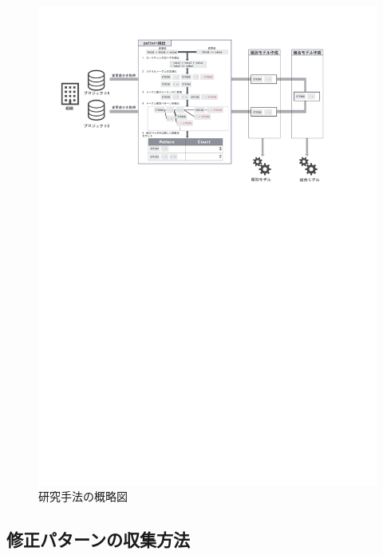 \documentclass[T,J]{fose} %
\begin{document}
\begin{figure}[t]
\centerline{\includegraphics[width=1.0\linewidth]{Noguchi_fig/pattern_generate.pdf}}
\caption{研究手法の概略図}
\label{fig:pattern_generate}
\end{figure}

\subsection{修正パターンの収集方法}\label{subsec:collect}
\end{document}
